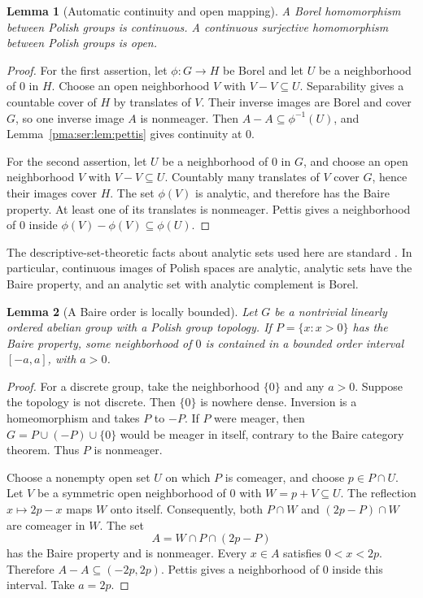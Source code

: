 \documentclass[11pt]{article}
\numberwithin{equation}{section}
\newtheorem{lemma}[lemma]{Lemma}
\theoremstyle{definition}
\theoremstyle{remark}
\begin{document}
\begin{lemma}[Automatic continuity and open mapping]\label{pma:ser:lem:automatic}
A Borel homomorphism between Polish groups is continuous. A continuous
surjective homomorphism between Polish groups is open.
\end{lemma}
\begin{proof}
For the first assertion, let $\phi:G\to H$ be Borel and let $U$ be a
neighborhood of $0$ in $H$. Choose an open neighborhood $V$ with
$V-V\subseteq U$. Separability gives a countable cover of $H$ by translates
of $V$. Their inverse images are Borel and cover $G$, so one inverse image
$A$ is nonmeager. Then $A-A\subseteq\phi^{-1}(U)$, and
Lemma~\ref{pma:ser:lem:pettis} gives continuity at $0$.

For the second assertion, let $U$ be a neighborhood of $0$ in $G$, and choose
an open neighborhood $V$ with $V-V\subseteq U$. Countably many translates of
$V$ cover $G$, hence their images cover $H$. The set $\phi(V)$ is analytic,
and therefore has the Baire property. At least one of its translates is
nonmeager. Pettis gives a neighborhood of $0$ inside
$\phi(V)-\phi(V)\subseteq\phi(U)$.
\end{proof}

The descriptive-set-theoretic facts about analytic sets used here are standard
\cite{Kechris}. In particular, continuous images of Polish spaces are analytic,
analytic sets have the Baire property, and an analytic set with analytic
complement is Borel.

\begin{lemma}[A Baire order is locally bounded]\label{pma:ser:lem:bound}
Let $G$ be a nontrivial linearly ordered abelian group with a Polish group
topology. If $P=\{x:x>0\}$ has the Baire property, some neighborhood of $0$
is contained in a bounded order interval $[-a,a]$, with $a>0$.
\end{lemma}
\begin{proof}
For a discrete group, take the neighborhood $\{0\}$ and any $a>0$.
Suppose the topology is not discrete. Then $\{0\}$ is nowhere dense.
Inversion is a homeomorphism and takes $P$ to $-P$. If $P$ were meager, then
$G=P\cup(-P)\cup\{0\}$ would be meager in itself, contrary to the Baire
category theorem. Thus $P$ is nonmeager.

Choose a nonempty open set $U$ on which $P$ is comeager, and choose
$p\in P\cap U$. Let $V$ be a symmetric open neighborhood of $0$ with
$W=p+V\subseteq U$. The reflection $x\mapsto 2p-x$ maps $W$ onto itself.
Consequently, both $P\cap W$ and $(2p-P)\cap W$ are comeager in $W$. The set
\[
 A=W\cap P\cap(2p-P)
\]
has the Baire property and is nonmeager. Every $x\in A$ satisfies
$0<x<2p$. Therefore $A-A\subseteq(-2p,2p)$. Pettis gives a neighborhood of
$0$ inside this interval. Take $a=2p$.
\end{proof}
\end{document}
